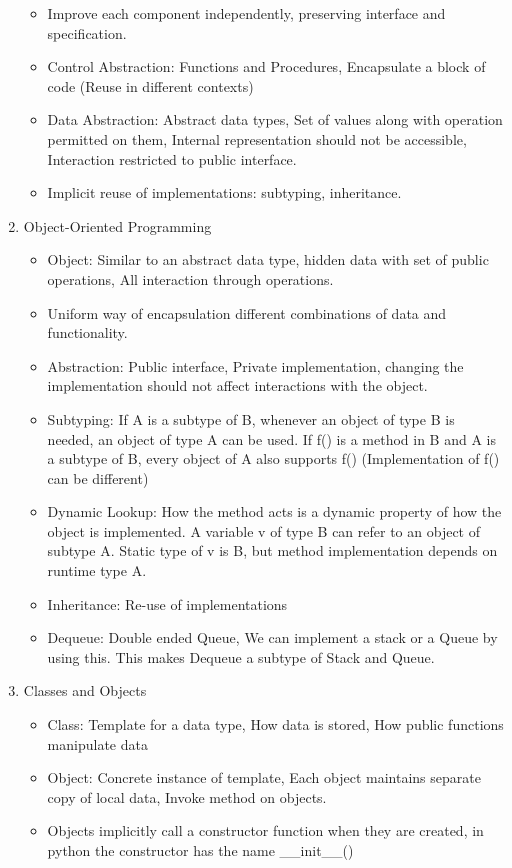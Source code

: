 \documentclass[a4paper]{article}
\begin{document}
\begin{enumerate}
\begin{itemize}
        \item Improve each component independently, preserving interface and specification.
        \item Control Abstraction: Functions and Procedures, Encapsulate a block of code (Reuse in different contexts)
        \item Data Abstraction: Abstract data types, Set of values along with operation permitted on them, Internal representation should not be accessible, Interaction restricted to public interface.
        \item Implicit reuse of implementations: subtyping, inheritance.
    \end{itemize}
    \item Object-Oriented Programming
    \begin{itemize}
        \item Object: Similar to an abstract data type, hidden data with set of public operations, All interaction through operations.
        \item Uniform way of encapsulation different combinations of data and functionality.
        \item Abstraction: Public interface, Private implementation, changing the implementation should not affect interactions with the object.
        \item Subtyping: If A is a subtype of B, whenever an object of type B is needed, an object of type A can be used. If f() is a method in B and A is a subtype of B, every object of A also supports f() (Implementation of f() can be different)
        \item Dynamic Lookup: How the method acts is a dynamic property of how the object is implemented. A variable v of type B can refer to an object of subtype A. Static type of v is B, but method implementation depends on runtime type A.
        \item Inheritance: Re-use of implementations
        \item Dequeue: Double ended Queue, We can implement a stack or a Queue by using this. This makes Dequeue a subtype of Stack and Queue.
    \end{itemize}
    \item Classes and Objects
    \begin{itemize}
        \item Class: Template for a data type, How data is stored, How public functions manipulate data
        \item Object: Concrete instance of template, Each object maintains separate copy of local data, Invoke method on objects.
        \item Objects implicitly call a constructor function when they are created, in python the constructor has the name \_\_init\_\_()
    \end{itemize}
\end{enumerate}
\end{document}
